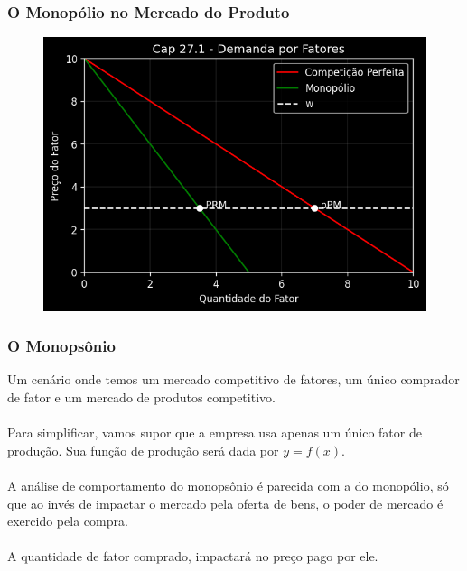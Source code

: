 \documentclass{beamer}[10]
\begin{document}
\begin{frame}
	\frametitle{O Monopólio no Mercado do Produto}

	\begin{figure}[H]
		\centering
		\includegraphics[scale=0.7]{cap27_1-demanda_fatores.png}
	\end{figure}

\end{frame}

\begin{frame}
	\frametitle{O Monopsônio}

	Um cenário onde temos um mercado competitivo de fatores, um único comprador de fator e um mercado de produtos competitivo.
	\\~\\
	Para simplificar, vamos supor que a empresa usa apenas um único fator de produção. Sua função de produção será dada por $y = f(x)$.  
	\\~\\
	A análise de comportamento do monopsônio é parecida com a do monopólio, só que ao invés de impactar o mercado pela oferta de bens, o poder de mercado é exercido pela compra. 
	\\~\\
	A quantidade de fator comprado, impactará no preço pago por ele.

\end{frame}
\end{document}
